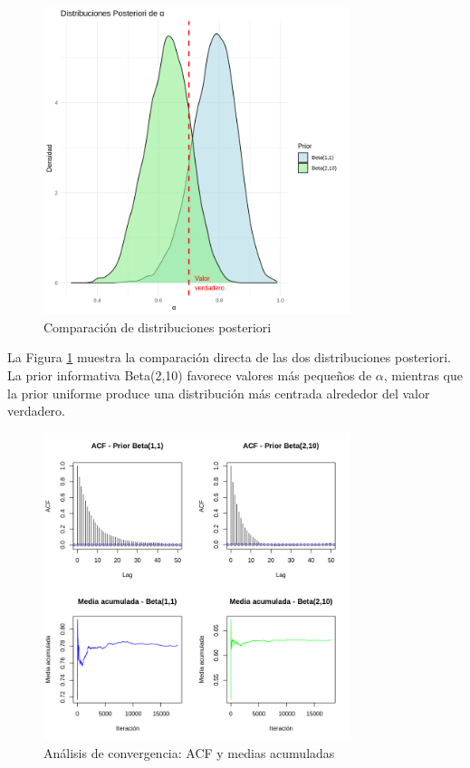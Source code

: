 \documentclass[12pt,a4paper]{article}
\begin{document}
\begin{figure}[h]
\centering
\includegraphics[width=0.8\textwidth]{images/Problem3_3.png}
\caption{Comparación de distribuciones posteriori}
\label{fig:densidades_problema3}
\end{figure}

La Figura \ref{fig:densidades_problema3} muestra la comparación directa de las dos distribuciones posteriori. La prior informativa Beta(2,10) favorece valores más pequeños de $\alpha$, mientras que la prior uniforme produce una distribución más centrada alrededor del valor verdadero.

\begin{figure}[h]
\centering
\includegraphics[width=0.8\textwidth]{images/Problem3_4.png}
\caption{Análisis de convergencia: ACF y medias acumuladas}
\label{fig:convergencia_problema3}
\end{figure}
\end{document}
